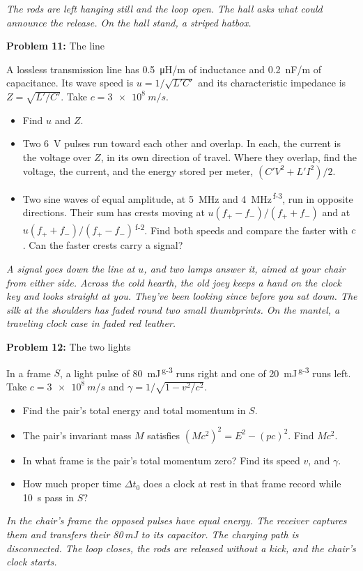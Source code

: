 \documentclass[11pt]{article}
\newcommand{\room}[1]{\par\bigskip{\large\bfseries #1}\par\nopagebreak\smallskip}
\newcommand{\scene}[1]{\par{\itshape #1}\par}
\newcommand{\problem}[2]{\par\medskip\textbf{Problem #1:} #2\par\nopagebreak}
\newenvironment{parts}{\begin{itemize}[leftmargin=3.4em,labelwidth=2.8em,labelsep=0.6em,align=left,itemsep=2pt,topsep=3pt]}{\end{itemize}}
\newcommand{\pt}[1]{\item[\textbf{#1}]}
\newcommand{\sv}[1]{\textsuperscript{\dag\,#1}}
\begin{document}
\room{Hall}
\scene{The rods are left hanging still and the loop open. The hall asks what could announce the release. On the hall stand, a striped hatbox.}
\problem{11}{The line}
A lossless transmission line has \SI{0.5}{\micro H/m} of inductance and \SI{0.2}{nF/m} of capacitance. Its wave speed is $u = 1/\sqrt{L'C'}$ and its characteristic impedance is $Z = \sqrt{L'/C'}$. Take $c = \SI{3e8}{m/s}$.
\begin{parts}
\pt{11-a} Find $u$ and $Z$.
\pt{11-b} Two \SI{6}{V} pulses run toward each other and overlap. In each, the current is the voltage over $Z$, in its own direction of travel. Where they overlap, find the voltage, the current, and the energy stored per meter, $(C'V^2 + L'I^2)/2$.
\pt{11-c} Two sine waves of equal amplitude, at \SI{5}{MHz} and \SI{4}{MHz}\sv{f-3}, run in opposite directions. Their sum has crests moving at $u(f_+ - f_-)/(f_+ + f_-)$ and at $u(f_+ + f_-)/(f_+ - f_-)$\sv{f-2}. Find both speeds and compare the faster with $c$. Can the faster crests carry a signal?
\end{parts}

\room{Lounge}
\scene{A signal goes down the line at $u$, and two lamps answer it, aimed at your chair from either side. Across the cold hearth, the old joey keeps a hand on the clock key and looks straight at you. They've been looking since before you sat down. The silk at the shoulders has faded round two small thumbprints. On the mantel, a traveling clock case in faded red leather.}
\problem{12}{The two lights}
In a frame $S$, a light pulse of \SI{80}{mJ}\sv{g-3} runs right and one of \SI{20}{mJ}\sv{g-3} runs left. Take $c = \SI{3e8}{m/s}$ and $\gamma = 1/\sqrt{1 - v^2/c^2}$.
\begin{parts}
\pt{12-a} Find the pair's total energy and total momentum in $S$.
\pt{12-b} The pair's invariant mass $M$ satisfies $(Mc^2)^2 = E^2 - (pc)^2$. Find $Mc^2$.
\pt{12-c} In what frame is the pair's total momentum zero? Find its speed $v$, and $\gamma$.
\pt{12-d} How much proper time $\Delta t_0$ does a clock at rest in that frame record while \SI{10}{s} pass in $S$?
\end{parts}
\scene{In the chair's frame the opposed pulses have equal energy. The receiver captures them and transfers their 80\,mJ to its capacitor. The charging path is disconnected. The loop closes, the rods are released without a kick, and the chair's clock starts.}
\end{document}

